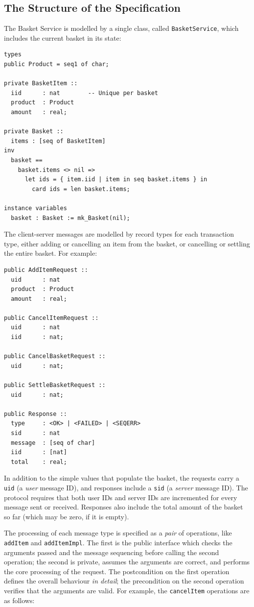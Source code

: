 \documentclass{overturerepchap}
\begin{document}
\subsection{The Structure of the Specification}

The Basket Service is modelled by a single class, called \texttt{BasketService}, which
includes the current basket in its state:

\small
\begin{lstlisting}
types
public Product = seq1 of char;

private BasketItem ::
  iid      : nat		-- Unique per basket
  product  : Product
  amount   : real;

private Basket ::
  items : [seq of BasketItem]
inv
  basket ==
    basket.items <> nil =>
      let ids = { item.iid | item in seq basket.items } in
        card ids = len basket.items;

instance variables
  basket : Basket := mk_Basket(nil);
\end{lstlisting}
\normalsize

\noindent The client-server messages are modelled by record types for each
transaction type, either adding or cancelling an item from the basket, or cancelling or
settling the entire basket. For example:

\small
\begin{lstlisting}
public AddItemRequest ::
  uid      : nat
  product  : Product
  amount   : real;

public CancelItemRequest ::
  uid      : nat
  iid      : nat;

public CancelBasketRequest ::
  uid      : nat;

public SettleBasketRequest ::
  uid      : nat;

public Response ::
  type     : <OK> | <FAILED> | <SEQERR>
  sid      : nat
  message  : [seq of char]
  iid      : [nat]
  total    : real;
\end{lstlisting}
\normalsize

\noindent In addition to the simple values that populate the basket, the
requests carry a \texttt{uid} (a \emph{user} message ID), and responses include
a \texttt{sid} (a \emph{server} message ID). The protocol requires that both
user IDs and server IDs are incremented for every message sent or received.
Responses also include the total amount of the basket so far (which may be
zero, if it is empty).

The processing of each message type is specified as a \emph{pair} of operations,
like \texttt{addItem} and \texttt{addItemImpl}. The first is the public
interface which checks the arguments passed and the message sequencing before
calling the second operation; the second is private, assumes the arguments are
correct, and performs the core processing of the request. The postcondition on
the first operation defines the overall behaviour \emph{in detail}; the
precondition on the second operation verifies that the arguments are valid. For
example, the \texttt{cancelItem} operations are as follows:
\end{document}
